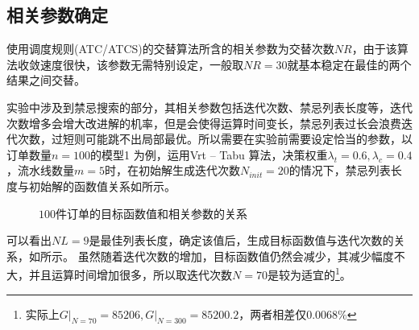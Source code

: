 \subsection{相关参数确定}
使用调度规则(ATC/ATCS)的交替算法所含的相关参数为交替次数$NR$，由于该算法收敛速度很快，该参数无需特别设定，一般取$NR = 30$就基本稳定在最佳的两个结果之间交替。

实验中涉及到禁忌搜索的部分，其相关参数包括迭代次数、禁忌列表长度等，迭代次数增多会增大改进解的机率，但是会使得运算时间变长，禁忌列表过长会浪费迭代次数，过短则可能跳不出局部最优。所以需要在实验前需要设定恰当的参数，以订单数量$n = 100$的模型1 为例，运用Vrt -- Tabu 算法，决策权重$\lambda_t =0.6, \lambda_c = 0.4$，流水线数量$m = 5$时，在初始解生成迭代次数$N_{init} = 20$的情况下，禁忌列表长度与初始解的函数值关系如所示。
\begin{figure}[h]
\centering
\subfloat[禁忌列表长度]{\texttt{[image: NL\_100]}\label{fig:100NLwithGoal}}
\subfloat[迭代次数]{\texttt{[image: N\_100]}\label{fig:100NwithGoal}}
\caption{$100$件订单的目标函数值和相关参数的关系}
\end{figure}

可以看出$NL = 9$是最佳列表长度，确定该值后，生成目标函数值与迭代次数的关系，如所示。
虽然随着迭代次数的增加，目标函数值仍然会减少，其减少幅度不大，并且运算时间增加很多，所以取迭代次数$N = 70$是较为适宜的\footnote{实际上$\left. G\right|_{N=70} = 85206, \left. G\right|_{N=300} = 85200.2$，两者相差仅$0.0068\%$}。


